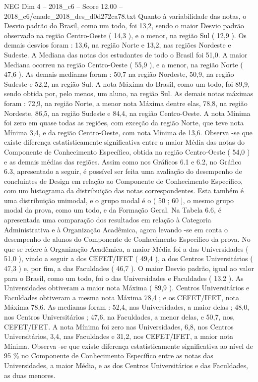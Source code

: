 \begin{textsample}{NEG Dim 4 – 2018\_c6 – Score 12.00 – 2018\_c6/enade\_2018\_des\_d0d272ca78.txt}
Quanto à variabilidade das notas, o Desvio padrão do Brasil, como um todo, foi 13,2, sendo o maior Desvio padrão observado na região Centro-Oeste ( 14,3 ), e o menor, na região Sul ( 12,9 ).
Os demais desvios foram : 13,6, na região Norte e 13,2, nas regiões Nordeste e Sudeste.
A Mediana das notas dos estudantes de todo o Brasil foi 51,0.
A maior Mediana ocorreu na região Centro-Oeste ( 55,9 ), e a menor, na região Norte ( 47,6 ).
As demais medianas foram : 50,7 na região Nordeste, 50,9, na região Sudeste e 52,2, na região Sul.
A nota Máxima do Brasil, como um todo, foi 89,9, sendo obtida por, pelo menos, um aluno, na região Sul.
As demais notas máximas foram : 72,9, na região Norte, a menor nota Máxima dentre elas, 78,8, na região Nordeste, 86,5, na região Sudeste e 84,4, na região Centro-Oeste.
A nota Mínima foi zero em quase todas as regiões, com exceção da região Norte, que teve nota Mínima 3,4, e da região Centro-Oeste, com nota Mínima de 13,6.
Observa -se que existe diferença estatisticamente significativa entre a maior Média das notas do Componente de Conhecimento Específico, obtida na região Centro-Oeste ( 54,0 ) e as demais médias das regiões.
Assim como nos Gráficos 6.1 e 6.2, no Gráfico 6.3, apresentado a seguir, é possível ser feita uma avaliação do desempenho de concluintes de Design em relação ao Componente de Conhecimento Específico, com um histograma da distribuição das notas correspondentes.
Esta também é uma distribuição unimodal, e o grupo modal é o ( 50 ; 60 ], o mesmo grupo modal da prova, como um todo, e da Formação Geral.
Na Tabela 6.6, é apresentada uma comparação dos resultados em relação à Categoria Administrativa e à Organização Acadêmica, agora levando -se em conta o desempenho de alunos do Componente de Conhecimento Específico da prova.
No que se refere à Organização Acadêmica, a maior Média foi a das Universidades ( 51,0 ), vindo a seguir a dos CEFET/IFET ( 49,4 ), a dos Centros Universitários ( 47,3 ) e, por fim, a das Faculdades ( 46,7 ).
O maior Desvio padrão, igual ao valor para o Brasil, como um todo, foi o das Universidades e Faculdades ( 13,2 ).
As Universidades obtiveram a maior nota Máxima ( 89,9 ).
Centros Universitários e Faculdades obtiveram a mesma nota Máxima 78,4 ; e os CEFET/IFET, nota Máxima 78,6.
As medianas foram : 52,4, nas Universidades, a maior delas ; 48,0, nos Centros Universitários ; 47,6, na Faculdades, a menor delas, e 50,7, nos, CEFET/IFET.
A nota Mínima foi zero nas Universidades, 6,8, nos Centros Universitários, 3,4, nas Faculdades e 31,2, nos CEFET/IFET, a maior nota Mínima.
Observa -se que existe diferença estatisticamente significativa ao nível de 95 \% no Componente de Conhecimento Específico entre as notas das Universidades, a maior Média, e as dos Centros Universitários e das Faculdades, as duas menores.

\end{textsample}

